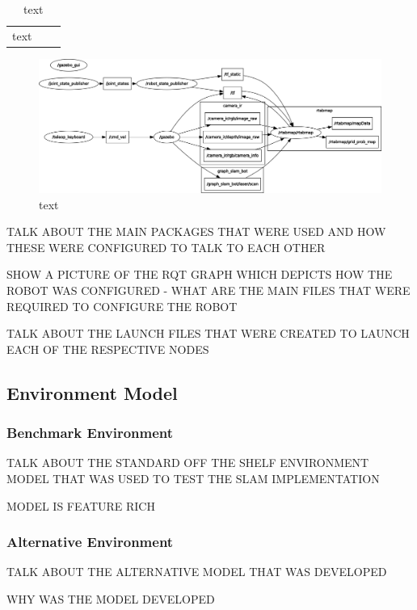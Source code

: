 \documentclass[a4paper]{article}
\begin{document}
\begin{table}
	\centering
	\caption{text}
	\begin{tabular}{lll}
		text & & \\
	\end{tabular}
\end{table}

\clearpage

\begin{figure}
	\centering
	\includegraphics[scale=0.4]{rosgraph}
	\caption{text}
\end{figure}

\clearpage

TALK ABOUT THE MAIN PACKAGES THAT WERE USED AND HOW THESE WERE CONFIGURED TO TALK TO EACH OTHER

SHOW A PICTURE OF THE RQT GRAPH WHICH DEPICTS HOW THE ROBOT WAS CONFIGURED - WHAT ARE THE MAIN FILES THAT WERE REQUIRED TO CONFIGURE THE ROBOT

TALK ABOUT THE LAUNCH FILES THAT WERE CREATED TO LAUNCH EACH OF THE RESPECTIVE NODES

\subsection{Environment Model}

\subsubsection{Benchmark Environment}
TALK ABOUT THE STANDARD OFF THE SHELF ENVIRONMENT MODEL THAT WAS USED TO TEST THE SLAM IMPLEMENTATION

MODEL IS FEATURE RICH

\subsubsection{Alternative Environment}
TALK ABOUT THE ALTERNATIVE MODEL THAT WAS DEVELOPED

WHY WAS THE MODEL DEVELOPED
\end{document}
